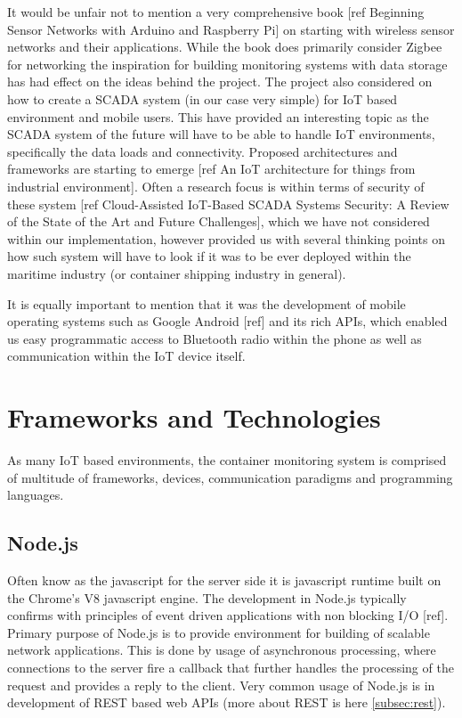 It would be unfair not to mention a very comprehensive book [ref Beginning Sensor Networks with Arduino and Raspberry Pi] on starting with wireless sensor networks and their applications. While the book does primarily consider Zigbee for networking the inspiration for building monitoring systems with data storage has had effect on the ideas behind the project. The project also considered on how to create a SCADA system (in our case very simple) for IoT based environment and mobile users. This have provided an interesting topic as the SCADA system of the future will have to be able to handle IoT environments, specifically the data loads and connectivity. Proposed architectures and frameworks are starting to emerge [ref An IoT architecture for things from industrial environment]. Often a research focus is within terms of security of these system [ref Cloud-Assisted IoT-Based SCADA Systems Security: A Review of the State of the Art and Future Challenges], which we have not considered within our implementation, however provided us with several thinking points on how such system will have to look if it was to be ever deployed within the maritime industry (or container shipping industry in general).

\bigskip

It is equally important to mention that it was the development of mobile operating systems such as Google Android [ref] and its rich APIs, which enabled us easy programmatic access to Bluetooth radio within the phone as well as communication within the IoT device itself.


\section{Frameworks and Technologies}
\label{sec:fram-techn}

As many IoT based environments, the container monitoring system is comprised of multitude of frameworks, devices, communication paradigms and programming languages.

\subsection{Node.js}
\label{subsec:Node}

Often know as the javascript for the server side it is javascript runtime built on the Chrome's V8 javascript engine. The development in Node.js typically confirms with principles of event driven applications with non blocking I/O [ref]. Primary purpose of Node.js is to provide environment for building of scalable network applications. This is done by usage of asynchronous processing, where connections to the server fire a callback that further handles the processing of the request and provides a reply to the client. Very common usage of Node.js is in development of REST based web APIs (more about REST is here \autoref{subsec:rest}).

